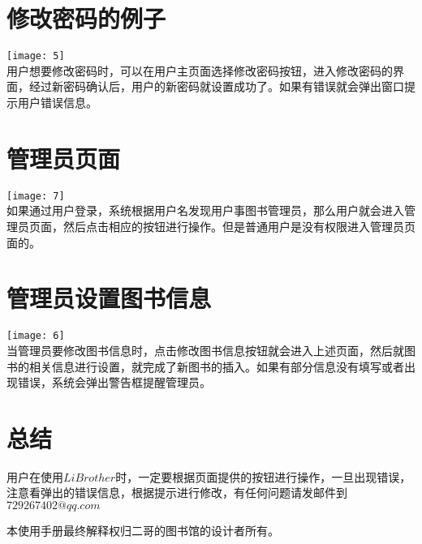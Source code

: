 \documentclass[UFT8]{ctexart}
\begin{document}
\section{修改密码的例子}
\texttt{[image: 5]}\\
用户想要修改密码时，可以在用户主页面选择修改密码按钮，进入修改密码的界面，经过新密码确认后，用户的新密码就设置成功了。如果有错误就会弹出窗口提示用户错误信息。
\section{管理员页面}
\texttt{[image: 7]}\\
如果通过用户登录，系统根据用户名发现用户事图书管理员，那么用户就会进入管理员页面，然后点击相应的按钮进行操作。但是普通用户是没有权限进入管理员页面的。
\section{管理员设置图书信息}
\texttt{[image: 6]}\\
当管理员要修改图书信息时，点击修改图书信息按钮就会进入上述页面，然后就图书的相关信息进行设置，就完成了新图书的插入。如果有部分信息没有填写或者出现错误，系统会弹出警告框提醒管理员。
\section{总结}
用户在使用$LiBrother$时，一定要根据页面提供的按钮进行操作，一旦出现错误，注意看弹出的错误信息，根据提示进行修改，有任何问题请发邮件到$729267402@qq.com$

本使用手册最终解释权归二哥的图书馆的设计者所有。
\end{document}
